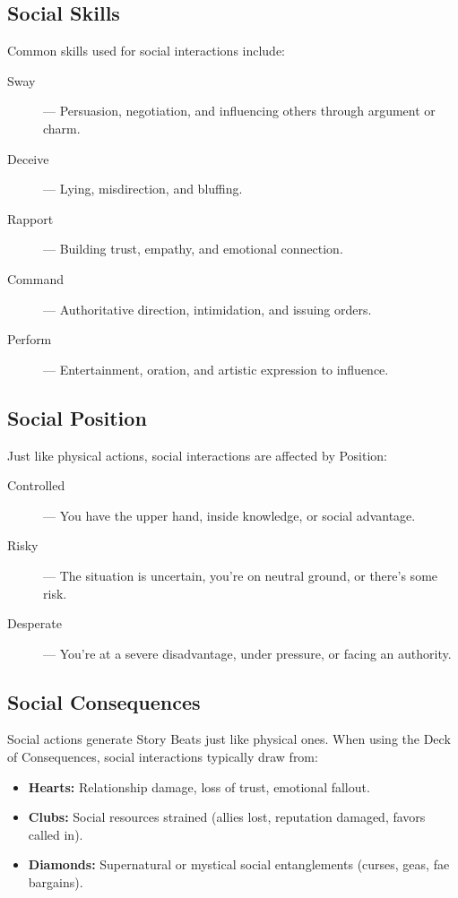 \subsection*{Social Skills}

Common skills used for social interactions include:
\begin{description}
  \item[Sway]  — Persuasion, negotiation, and influencing others through argument or charm.
  \item[Deceive]  — Lying, misdirection, and bluffing.
  \item[Rapport]  — Building trust, empathy, and emotional connection.
  \item[Command]  — Authoritative direction, intimidation, and issuing orders.
  \item[Perform]  — Entertainment, oration, and artistic expression to influence.
\end{description}

\subsection*{Social Position}

Just like physical actions, social interactions are affected by Position:
\begin{description}
  \item[Controlled]  — You have the upper hand, inside knowledge, or social advantage.
  \item[Risky]  — The situation is uncertain, you're on neutral ground, or there's some risk.
  \item[Desperate]  — You're at a severe disadvantage, under pressure, or facing an authority.
\end{description}

\subsection*{Social Consequences}

Social actions generate Story Beats just like physical ones. When using the Deck of Consequences, social interactions typically draw from:
\begin{itemize}
  \item \textbf{Hearts:} Relationship damage, loss of trust, emotional fallout.
  \item \textbf{Clubs:} Social resources strained (allies lost, reputation damaged, favors called in).
  \item \textbf{Diamonds:} Supernatural or mystical social entanglements (curses, geas, fae bargains).
\end{itemize}

